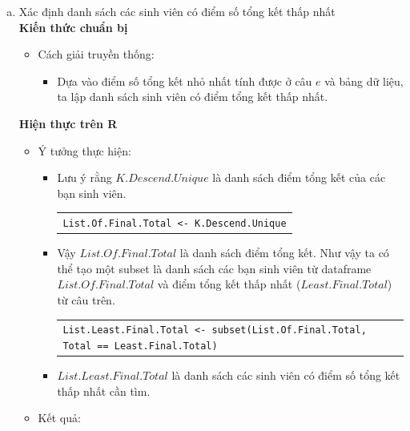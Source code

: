 \documentclass[a4paper]{article}
\theoremstyle{definition}
\begin{document}
\begin{enumerate}[a)]
\begin{itemize}
\begin{itemize}
\begin{center}
\begin{tabular}{l c}
                \end{tabular}
            \end{center}
        \end{itemize}
    \end{itemize}
    \bf\item {Xác định danh sách các sinh viên có điểm số tổng kết thấp nhất}\\[6pt]
    \bf Kiến thức chuẩn bị\normalfont
    \begin{itemize}
        \item Cách giải truyền thống:
        \begin{itemize}
            \item Dựa vào điểm số tổng kết nhỏ nhất tính được ở câu $e$ và bảng dữ liệu, ta lập danh sách sinh viên có điểm tổng kết thấp nhất.
        \end{itemize}
    \end{itemize}
    \bf Hiện thực trên R\normalfont
    \begin{itemize}
        \item Ý tưởng thực hiện:
        \begin{itemize}
            \item Lưu ý rằng $K.Descend.Unique$ là danh sách điểm tổng kết của các bạn sinh viên.
            \begin{center}
                \begin{tabular}{p{13cm}}
                    \texttt{List.Of.Final.Total <- K.Descend.Unique}
                \end{tabular}
            \end{center}
            \item Vậy $List.Of.Final.Total$ là danh sách điểm tổng kết. Như vậy ta có thể tạo một subset là danh sách các bạn sinh viên từ dataframe $List.Of.Final.Total$ và điểm tổng kết thấp nhất ($Least.Final.Total$) từ câu trên.
            \begin{center}
                \begin{tabular}{p{13cm}}
                    \texttt{List.Least.Final.Total <- subset(List.Of.Final.Total, Total == Least.Final.Total)}
                \end{tabular}
            \end{center}
            \item $List.Least.Final.Total$ là danh sách các sinh viên có điểm số tổng kết thấp nhất cần tìm.
        \end{itemize}
        \item Kết quả:

\end{itemize}
\end{enumerate}
\end{document}
